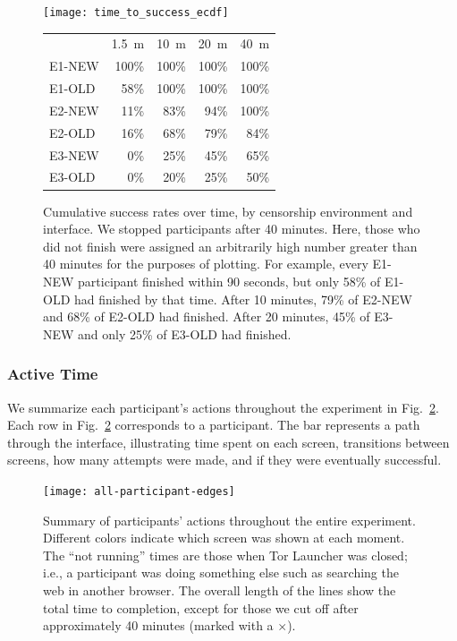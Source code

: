\documentclass[USenglish,oneside,twocolumn]{article}
\begin{document}
\begin{figure}[t]
\centering
\texttt{[image: time\_to\_success\_ecdf]}
	\begin{tabular}{l r r r r}
	& \multicolumn{1}{c}{1.5~m} & \multicolumn{1}{c}{10~m} & \multicolumn{1}{c}{20~m} & \multicolumn{1}{c}{40~m} \\
	\noalign{\hrule}
	E1-NEW & 100\% & 100\% & 100\% & 100\% \\
	E1-OLD & 58\% & 100\% & 100\% & 100\% \\
	E2-NEW & 11\% & 83\% & 94\% & 100\% \\
	E2-OLD & 16\% & 68\% & 79\% & 84\% \\
	E3-NEW & 0\% & 25\% & 45\% & 65\% \\
	E3-OLD & 0\% & 20\% & 25\% & 50\% \\
	\end{tabular}
\caption{
Cumulative success rates over time, by censorship environment and interface.
We stopped participants after 40 minutes. Here, those who did not finish were assigned
an arbitrarily high number greater than 40 minutes for the purposes of plotting. 
For example, every E1-NEW participant finished within 90 seconds,
but only 58\% of E1-OLD had finished by that time.
After 10 minutes, 79\% of E2-NEW and 68\% of E2-OLD had finished.
After 20 minutes, 45\% of E3-NEW and only 25\% of E3-OLD had finished.
}
\label{fig:time_to_success_ecdf}
\end{figure}

\subsubsection{Active Time} 
We summarize each participant's actions throughout the experiment in Fig.~\ref{fig:all-participant-edges}. Each row in Fig.~\ref{fig:all-participant-edges} corresponds to a participant. The bar represents a path through the interface, illustrating time spent on each screen, transitions between screens, how many attempts were made, and if they were eventually successful. 

\begin{figure}
\centering
\texttt{[image: all-participant-edges]}
\caption{
Summary of participants' actions throughout the entire experiment.
Different colors indicate which screen was shown at each moment.
The ``not running'' times are those when Tor Launcher was closed;
i.e., a participant was doing something else
such as searching the web in another browser.
The overall length of the lines show the total time to completion,
except for those we cut off after approximately 40 minutes
(marked with a $\times$).
}
\label{fig:all-participant-edges}
\end{figure}
\end{document}
